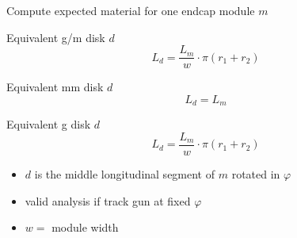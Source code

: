 \documentclass[pdftex, 11pt]{beamer}
\begin{document}
\begin{frame}{Compute expected material for one endcap module \alert{$m$}}
  \begin{block}{Equivalent \alert{g/m} disk \alert{$d$}}
    $$
    L_d = \frac{L_m}{w}\cdot \pi (r_1 + r_2)
    $$
  \end{block}

  \begin{block}{Equivalent \alert{mm} disk \alert{$d$}}
    $$
    L_d = L_m
    $$
  \end{block}

  \begin{block}{Equivalent \alert{g} disk \alert{$d$}}
    $$
    L_d = \frac{L_m}{w}\cdot \pi (r_1 + r_2)
    $$
  \end{block}

  \begin{itemize}
  \item $d$ is the middle longitudinal segment of $m$ rotated in $\varphi$
  \item valid analysis if track gun at fixed $\varphi$
  \item $w = $ module width
  \end{itemize}
\end{frame}
\end{document}
